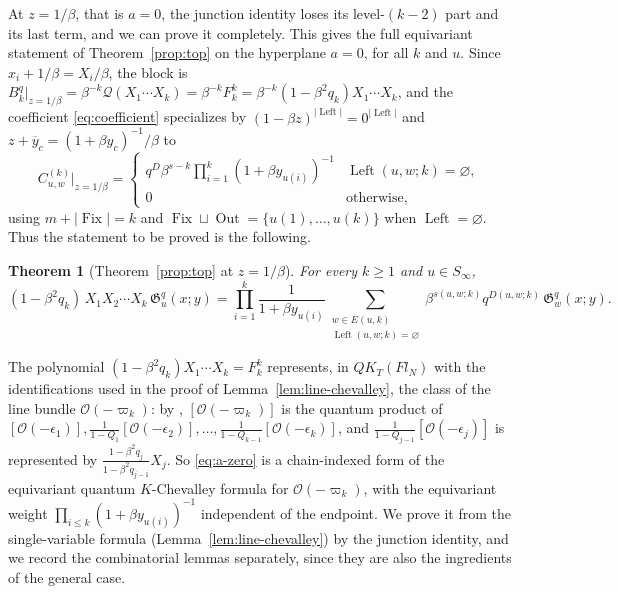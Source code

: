 \documentclass[11pt]{article}
\newtheorem{theorem}[proposition]{Theorem}
\newcommand{\G}{\mathfrak{G}}
\newcommand{\Q}{\mathcal{Q}}
\newcommand{\Fix}{\operatorname{Fix}}
\newcommand{\Left}{\operatorname{Left}}
\newcommand{\Out}{\operatorname{Out}}
\begin{document}
At $z=1/\beta$, that is $a=0$, the junction identity loses its
level-$(k-2)$ part and its last term, and we can prove it completely.
This gives the full equivariant statement of Theorem~\ref{prop:top}
on the hyperplane $a=0$, for all $k$ and $u$. Since
$x_i+1/\beta=X_i/\beta$, the block is
$B_k^q|_{z=1/\beta}=\beta^{-k}\Q(X_1\cdots X_k)=\beta^{-k}F_k^k
=\beta^{-k}(1-\beta^2q_k)X_1\cdots X_k$, and the coefficient
\eqref{eq:coefficient} specializes by
$(1-\beta z)^{|\Left|}=0^{|\Left|}$ and
$z+\overline y_c=(1+\beta y_c)^{-1}/\beta$ to
\[
 C^{(k)}_{u,w}\big|_{z=1/\beta}
 =\begin{cases}
   q^{D}\beta^{s-k}\prod_{i=1}^k(1+\beta y_{u(i)})^{-1}
    & \Left(u,w;k)=\varnothing,\\
   0&\text{otherwise},
  \end{cases}
\]
using $m+|\Fix|=k$ and $\Fix\sqcup\Out=\{u(1),\ldots,u(k)\}$ when
$\Left=\varnothing$. Thus the statement to be proved is the
following.

\begin{theorem}[Theorem~\ref{prop:top} at $z=1/\beta$]\label{thm:a-zero}
For every $k\geq1$ and $u\in S_\infty$,
\begin{equation}\label{eq:a-zero}
 (1-\beta^2q_k)\,X_1X_2\cdots X_k\,\G^q_u(x;y)
 =\prod_{i=1}^k\frac1{1+\beta y_{u(i)}}
  \sum_{\substack{w\in E(u,k)\\ \Left(u,w;k)=\varnothing}}
   \beta^{s(u,w;k)}q^{D(u,w;k)}\,\G^q_w(x;y).
\end{equation}
\end{theorem}

The polynomial $(1-\beta^2q_k)X_1\cdots X_k=F^k_k$ represents, in
$QK_T(Fl_N)$ with the identifications used in the proof of
Lemma~\ref{lem:line-chevalley}, the class of the line bundle
$\mathcal O(-\varpi_k)$: by \cite[Section~3.1]{maeno2024presentation2},
$[\mathcal O(-\varpi_k)]$ is the quantum product of
$[\mathcal O(-\epsilon_1)],\frac1{1-Q_1}[\mathcal O(-\epsilon_2)],
\ldots,\frac1{1-Q_{k-1}}[\mathcal O(-\epsilon_k)]$, and
$\frac{1}{1-Q_{j-1}}[\mathcal O(-\epsilon_j)]$ is represented by
$\frac{1-\beta^2q_j}{1-\beta^2q_{j-1}}X_j$. So \eqref{eq:a-zero} is a
chain-indexed form of the equivariant quantum $K$-Chevalley formula
for $\mathcal O(-\varpi_k)$, with the equivariant weight
$\prod_{i\leq k}(1+\beta y_{u(i)})^{-1}$ independent of the endpoint.
We prove it from the single-variable formula
(Lemma~\ref{lem:line-chevalley}) by the junction identity, and we
record the combinatorial lemmas separately, since they are also the
ingredients of the general case.
\end{document}
